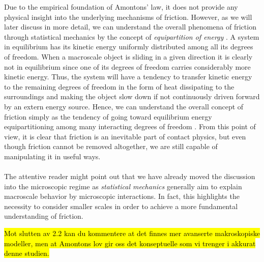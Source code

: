 Due to the empirical foundation of Amontons’ law, it does not provide any
physical insight into the underlying mechanisms of friction. However, as we will
later discuss in more detail, we can understand the overall phenomena of
friction through statistical mechanics by the concept of \textit{equipartition
of energy} \cite{Manini_2016}. A system in equilibrium has its kinetic energy
uniformly distributed among all its degrees of freedom. When a macroscale object
is sliding in a given direction it is clearly not in equilibrium since one of
its degrees of freedom carries considerably more kinetic energy. Thus, the
system will have a tendency to transfer kinetic energy to the remaining
degrees of freedom in the form of heat dissipating to the surroundings and making the object slow down if not continuously driven forward by an extern energy source.  Hence, we can understand the overall concept of friction simply
as the tendency of going toward equilibrium energy equipartitioning among many
interacting degrees of freedom \cite{Manini_2016}. From this point of view, it is
clear that friction is an inevitable part of contact physics, but even though
friction cannot be removed altogether, we are still capable of manipulating it
in useful ways. \\
\\
The attentive reader might point out that we have already moved the discussion
into the microscopic regime as \textit{statistical mechanics} generally
aim to explain macroscale behavior by microscopic interactions. In fact, this 
highlights the necessity to consider smaller scales in order to achieve a more fundamental understanding of friction.


\hl{Mot slutten av 2.2 kan du kommentere at det finnes mer avanserte makroskopiske modeller, men at Amontons lov gir oss det konseptuelle som vi trenger i akkurat denne studien.}







